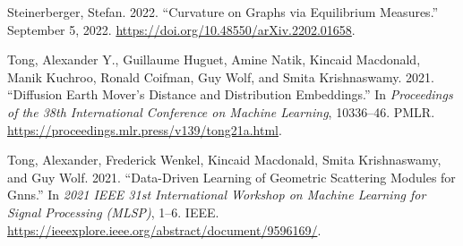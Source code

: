 \documentclass[
  letterpaper,
  DIV=11,
  numbers=noendperiod]{scrartcl}
\newlength{\cslhangindent}
\newenvironment{CSLReferences}[2] %
 {\begin{list}{}{%
  \setlength{\itemindent}{0pt}
  \setlength{\leftmargin}{0pt}
  \setlength{\parsep}{0pt}
  \ifodd #1
   \setlength{\leftmargin}{\cslhangindent}
   \setlength{\itemindent}{-1\cslhangindent}
  \fi
  \setlength{\itemsep}{#2\baselineskip}}}
 {\end{list}}
\theoremstyle{plain}
\theoremstyle{definition}
\theoremstyle{plain}
\theoremstyle{definition}
\theoremstyle{plain}
\theoremstyle{remark}
\begin{document}
\begin{CSLReferences}{1}{0}
Steinerberger, Stefan. 2022. {``Curvature on {Graphs} via {Equilibrium
Measures}.''} September 5, 2022.
\url{https://doi.org/10.48550/arXiv.2202.01658}.

Tong, Alexander Y., Guillaume Huguet, Amine Natik, Kincaid Macdonald,
Manik Kuchroo, Ronald Coifman, Guy Wolf, and Smita Krishnaswamy. 2021.
{``Diffusion {Earth Mover}'s {Distance} and {Distribution
Embeddings}.''} In \emph{Proceedings of the 38th {International
Conference} on {Machine Learning}}, 10336--46. PMLR.
\url{https://proceedings.mlr.press/v139/tong21a.html}.

Tong, Alexander, Frederick Wenkel, Kincaid Macdonald, Smita
Krishnaswamy, and Guy Wolf. 2021. {``Data-Driven Learning of Geometric
Scattering Modules for Gnns.''} In \emph{2021 {IEEE} 31st {International
Workshop} on {Machine Learning} for {Signal Processing} ({MLSP})}, 1--6.
IEEE. \url{https://ieeexplore.ieee.org/abstract/document/9596169/}.

\end{CSLReferences}
\end{document}

